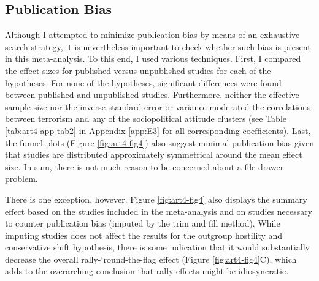 \subsection{Publication Bias}
Although I attempted to minimize publication bias by means of an exhaustive search strategy, it is nevertheless important to check whether such bias is present in this meta-analysis. To this end, I used various techniques. First, I compared the effect sizes for published versus unpublished studies for each of the hypotheses. For none of the hypotheses, significant differences were found between published and unpublished studies. Furthermore, neither the effective sample size nor the inverse standard error or variance moderated the correlations between terrorism and any of the sociopolitical attitude clusters (see Table \ref{tab:art4-app-tab2} in Appendix \ref{app:E3} for all corresponding coefficients). Last, the funnel plots (Figure \ref{fig:art4-fig4}) also suggest minimal publication bias given that studies are distributed approximately symmetrical around the mean effect size. In sum, there is not much reason to be concerned about a file drawer problem. 


There is one exception, however. Figure \ref{fig:art4-fig4} also displays the summary effect based on the studies included in the meta-analysis and on studies necessary to counter publication bias (imputed by the trim and fill method). While imputing studies does not affect the results for the outgroup hostility and conservative shift hypothesis, there is some indication that it would substantially decrease the overall rally-‘round-the-flag effect (Figure \ref{fig:art4-fig4}C), which adds to the overarching conclusion that rally-effects might be idiosyncratic.


